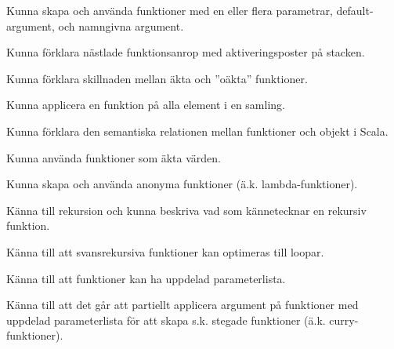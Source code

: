 
\item Kunna skapa och använda funktioner med en eller flera parametrar, default-argument, och namngivna argument.
\item Kunna förklara nästlade funktionsanrop med aktiveringsposter på stacken.
\item Kunna förklara skillnaden mellan äkta och ''oäkta'' funktioner.
\item Kunna applicera en funktion på alla element i en samling.

\item Kunna förklara den semantiska relationen mellan funktioner och objekt i Scala.
\item Kunna använda funktioner som äkta värden.
\item Kunna skapa och använda anonyma funktioner (ä.k. lambda-funktioner).

\item Känna till rekursion och kunna beskriva vad som kännetecknar en rekursiv funktion.
\item Känna till att svansrekursiva funktioner kan optimeras till loopar.

\item Känna till att funktioner kan ha uppdelad parameterlista.
\item Känna till att det går att partiellt applicera argument på funktioner med uppdelad parameterlista för att skapa s.k. stegade funktioner (ä.k. curry-funktioner).
